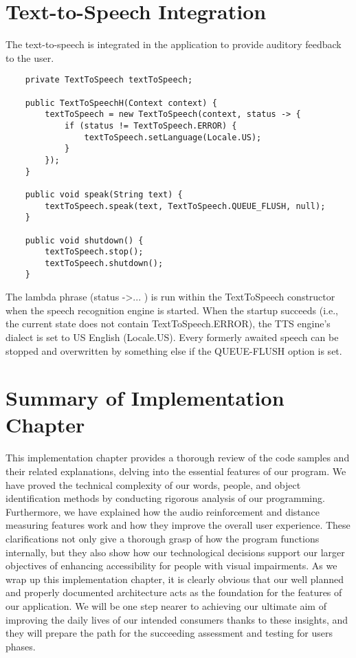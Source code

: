 \documentclass[MScCS]{uccthesis}
\begin{document}
       


 \section{Text-to-Speech Integration}

 The text-to-speech is integrated in the application to provide auditory feedback to the user. 

 \begin{scriptsize}
     \begin{verbatim}
    private TextToSpeech textToSpeech;

    public TextToSpeechH(Context context) {
        textToSpeech = new TextToSpeech(context, status -> {
            if (status != TextToSpeech.ERROR) {
                textToSpeech.setLanguage(Locale.US);
            }
        });
    }

    public void speak(String text) {
        textToSpeech.speak(text, TextToSpeech.QUEUE_FLUSH, null);
    }

    public void shutdown() {
        textToSpeech.stop();
        textToSpeech.shutdown();
    }
     \end{verbatim}
 \end{scriptsize}
  The lambda phrase (status ->... ) is run within the TextToSpeech 
 constructor when the speech recognition engine is started. When the startup succeeds (i.e., the current state does not contain TextToSpeech.ERROR), the TTS engine's dialect is set to US English (Locale.US). Every formerly awaited speech can be stopped and overwritten by something else if the QUEUE-FLUSH option is set.

\section{Summary of Implementation Chapter}
This implementation chapter provides a thorough review of the code samples and their related explanations, delving into the essential features of our program. We have proved the technical complexity of our words, people, and object identification methods by conducting rigorous analysis of our programming. Furthermore, we have explained how the audio reinforcement and distance measuring features work and how they improve the overall user experience. These clarifications not only give a thorough grasp of how the program functions internally, but they also show how our technological decisions support our larger objectives of enhancing accessibility for people with visual impairments. As we wrap up this implementation chapter, it is clearly obvious that our well planned and properly documented architecture acts as the foundation for the features of our application. We will be one step nearer to achieving our ultimate aim of improving the daily lives of our intended consumers thanks to these insights, and they will prepare the path for the succeeding assessment and testing for users phases.
\end{document}
